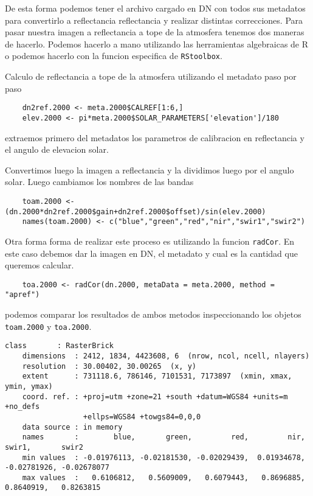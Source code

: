 De esta forma podemos tener el archivo cargado en DN con todos sus metadatos
para convertirlo a reflectancia reflectancia y realizar distintas correcciones.
Para pasar nuestra imagen a reflectancia a tope
de la atmosfera tenemos dos maneras de hacerlo. Podemos hacerlo a mano
utilizando las herramientas algebraicas de R o podemos hacerlo con la funcion
especifica de \texttt{RStoolbox}.

\begin{exa}
    Calculo de reflectancia a tope de la atmosfera
    utilizando el metadato paso por paso

    \begin{lstlisting}
    dn2ref.2000 <- meta.2000$CALREF[1:6,]
    elev.2000 <- pi*meta.2000$SOLAR_PARAMETERS['elevation']/180
    \end{lstlisting}
    extraemos primero del metadatos los parametros de calibracion en
    reflectancia y el angulo de elevacion solar.

    Convertimos luego la imagen a reflectancia y la dividimos luego por el
    angulo solar. Luego cambiamos los nombres de las bandas

    \begin{lstlisting}
    toam.2000 <- (dn.2000*dn2ref.2000$gain+dn2ref.2000$offset)/sin(elev.2000)
    names(toam.2000) <- c("blue","green","red","nir","swir1","swir2")
    \end{lstlisting}

    Otra forma forma de realizar este proceso es utilizando la funcion
    \texttt{radCor}. En este caso debemos dar la imagen en DN, el metadato y
    cual es la cantidad que queremos calcular.

    \begin{lstlisting}
    toa.2000 <- radCor(dn.2000, metaData = meta.2000, method = "apref")
    \end{lstlisting}

    podemos comparar los resultados de ambos metodos inspeccionando los objetos
    \texttt{toam.2000} y \texttt{toa.2000}.
    \begin{Verbatim}[fontsize=\small]
    class       : RasterBrick
    dimensions  : 2412, 1834, 4423608, 6  (nrow, ncol, ncell, nlayers)
    resolution  : 30.00402, 30.00265  (x, y)
    extent      : 731118.6, 786146, 7101531, 7173897  (xmin, xmax, ymin, ymax)
    coord. ref. : +proj=utm +zone=21 +south +datum=WGS84 +units=m +no_defs
                  +ellps=WGS84 +towgs84=0,0,0
    data source : in memory
    names       :        blue,       green,         red,         nir,    swir1,       swir2
    min values  : -0.01976113, -0.02181530, -0.02029439,  0.01934678,    -0.02781926, -0.02678077
    max values  :   0.6106812,   0.5609009,   0.6079443,   0.8696885,    0.8640919,   0.8263815
    \end{Verbatim}


\end{exa}

